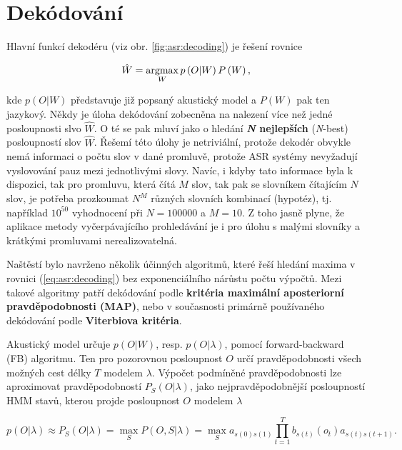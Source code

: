 \section{Dekódování}
\label{chap:asr:decoding}

Hlavní funkcí dekodéru (viz obr. \ref{fig:asr:decoding}) je řešení rovnice

\begin{equation}
  \hat{W} = \operatorname*{argmax}_{W} p\left(O | W\right)P\left(W\right),
  \label{eq:asr:decoding}
\end{equation}

\noindent kde $p\left(O|W\right)$ představuje již popsaný akustický model a $P\left(W\right)$ pak ten jazykový. Někdy je úloha dekódování zobecněna na nalezení více než jedné posloupnosti slvo $\hat{W}$. O té se pak mluví jako o hledání \textbf{\textit{N} nejlepších} (\textit{N}-best) posloupností slov $\hat{W}$.  Řešemí této úlohy je netriviální, protože dekodér obvykle nemá informaci o počtu slov v dané promluvě, protože ASR systémy nevyžadují vyslovování pauz mezi jednotlivými slovy. Navíc, i kdyby tato informace byla k dispozici, tak pro promluvu, která čítá $M$ slov, tak pak se slovníkem čítajícím $N$ slov, je potřeba prozkoumat $N^{M}$ různých slovních kombinací (hypotéz), tj. například $10^{50}$ vyhodnocení při $N=100000$ a $M=10$. Z toho jasně plyne, že aplikace metody vyčerpávajícího prohledávání je i pro úlohu s malými slovníky a krátkými promluvami nerealizovatelná.

Naštěstí bylo navrženo několik účinných algoritmů, které řeší hledání maxima v rovnici (\ref{eq:asr:decoding}) bez exponenciálního nárůstu počtu výpočtů. Mezi takové algoritmy patří dekódování podle \textbf{kritéria maximální aposteriorní pravděpodobnosti (MAP)}, nebo v současnosti primárně používaného dekódování podle \textbf{Viterbiova kritéria}.

Akustický model určuje $p\left(O|W\right)$, resp. $p\left(O|\lambda\right)$, pomocí forward-backward (FB) algoritmu. Ten pro pozorovnou posloupnost $O$ určí pravděpodobnosti všech možných cest délky $T$ modelem $\lambda$. Výpočet podmíněné pravděpodobnosti lze aproximovat pravděpodobností $P_S(O|\lambda)$, jako nejpravděpodobnější posloupností HMM stavů, kterou projde posloupnost $O$ modelem $\lambda$

\begin{equation}
  p\left(O|\lambda\right) \approx P_S\left(O|\lambda\right) = \max_S P\left(O, S| \lambda \right) = \max_S a_{s\left(0\right)s\left(1\right)} \prod_{t=1}^{T} b_{s\left(t\right)}\left(o_t\right) a_{s\left(t\right)s\left(t+1\right)}.
  \label{eq:asr:decoding:approx}
\end{equation}

